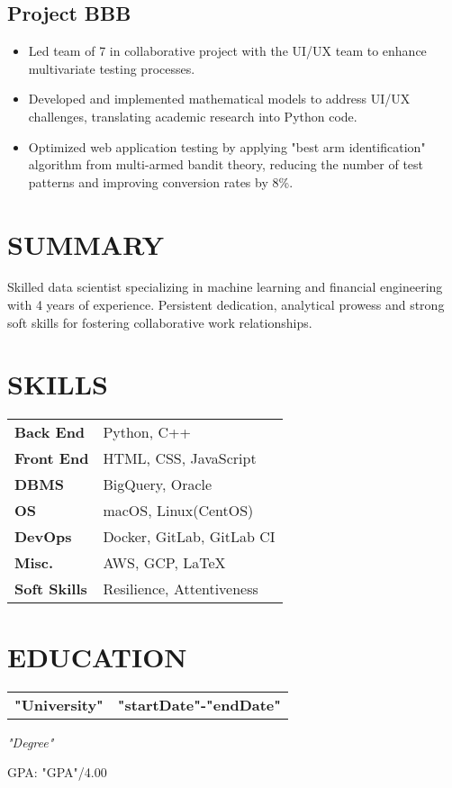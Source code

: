 \documentclass[11pt,a4paper]{moderncv}
\newcommand*{\projectentry}[2][1.5mm]{
    \subsection{#2} \vspace{-1.5mm}
    \par\addvspace{#1}
}
\newcommand*{\educationentry}[4][0.5mm]{
    \begin{tabularx}{\textwidth}{LR}
        {\bfseries #3} & {\bfseries #4} \\
    \end{tabularx}
    {\itshape #2}
    \par\addvspace{#1}
}
\begin{document}
\begin{minipage}[t]{0.62\textwidth}
\projectentry{Project BBB}

\begin{itemize}
    \item Led team of 7 in collaborative project with the UI/UX team to enhance multivariate testing processes.
    \item Developed and implemented mathematical models to address UI/UX challenges, translating academic research into Python code.
    \item Optimized web application testing by applying "best arm identification" algorithm from multi-armed bandit theory, reducing the number of test patterns and improving conversion rates by 8\%.
\end{itemize}


\end{minipage}
\hfill
\begin{minipage}[t]{0.35\textwidth}
\section{SUMMARY}
Skilled data scientist specializing in machine learning and financial engineering with 4 years of experience. Persistent dedication, analytical prowess and strong soft skills for fostering collaborative work relationships.

\section{SKILLS}
\begin{tabularx}{\textwidth}{>{\bfseries}l@{\hskip 3.5mm}L}
Back End & Python, C++ \\
Front End & HTML, CSS, JavaScript \\
DBMS & BigQuery, Oracle \\
OS & macOS, Linux(CentOS) \\
DevOps & Docker, GitLab, GitLab CI \\
Misc. & AWS, GCP, \LaTeX \\
Soft Skills & Resilience, Attentiveness
\end{tabularx}

\section{EDUCATION}
\educationentry{"Degree"}{"University"}{"startDate"-"endDate"}
GPA: "GPA"/4.00

\end{minipage}
\end{document}
